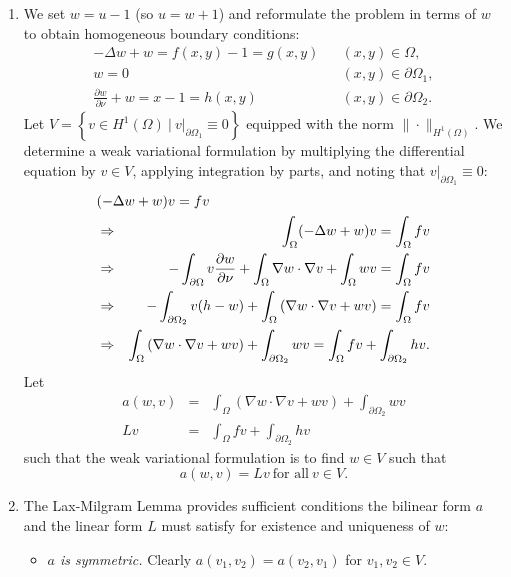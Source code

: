 \documentclass{article}
\begin{document}
\begin{enumerate}
\begin{enumerate}
\item We set \(w = u - 1\) (so \(u = w + 1\)) and reformulate the problem in terms of \(w\) to obtain homogeneous boundary conditions:
\begin{eqnarray*}
-\Delta w + w = f(x,y) - 1 = g(x,y) & & (x,y) \in \Omega, \\
w = 0 & & (x,y) \in \partial\Omega_1, \\
\frac{\partial w}{\partial \nu} + w = x - 1 = h(x,y) & & (x,y) \in \partial\Omega_2.
\end{eqnarray*}
Let \(V = \left\{ v \in H^1(\Omega) \ | \ v|_{\partial\Omega_1} \equiv 0 \right\}\) equipped with the norm \(\|\cdot\|_{H^1(\Omega)}\).  We determine a weak variational formulation by multiplying the differential equation by \(v \in V\), applying integration by parts, and noting that \(v|_{\partial\Omega_1} \equiv 0\):
\begin{eqnarray*}
\lefteqn{(-\Delta w + w) v = fv} \\
& \Rightarrow & \int_{\Omega} (-\Delta w + w) v = \int_{\Omega} fv \\
& \Rightarrow & -\int_{\partial\Omega} v \frac{\partial w}{\partial \nu} + \int_{\Omega} \nabla w \cdot \nabla v + \int_{\Omega} wv = \int_{\Omega} fv \\
& \Rightarrow & -\int_{\partial\Omega_2} v (h - w) + \int_{\Omega} \left( \nabla w \cdot \nabla v + wv \right) = \int_{\Omega} fv \\
& \Rightarrow & \int_{\Omega} \left( \nabla w \cdot \nabla v + wv \right) + \int_{\partial\Omega_2} wv = \int_{\Omega} fv + \int_{\partial\Omega_2} hv.
\end{eqnarray*}
Let
\begin{eqnarray*}
a(w,v) & = & \int_{\Omega} \left( \nabla w \cdot \nabla v + wv \right) + \int_{\partial\Omega_2} wv \\
L v & = & \int_{\Omega} fv + \int_{\partial\Omega_2} hv
\end{eqnarray*}
such that the weak variational formulation is to find \(w \in V\) such that
\[a(w,v) = Lv \ \text{for all} \ v \in V.\]

\item The Lax-Milgram Lemma provides sufficient conditions the bilinear form \(a\) and the linear form \(L\) must satisfy for existence and uniqueness of \(w\):

\begin{itemize}
\item {\em \(a\) is symmetric.}  Clearly \(a(v_1,v_2) = a(v_2,v_1)\) for \(v_1,v_2 \in V\).


\end{itemize}
\end{enumerate}
\end{enumerate}
\end{document}
